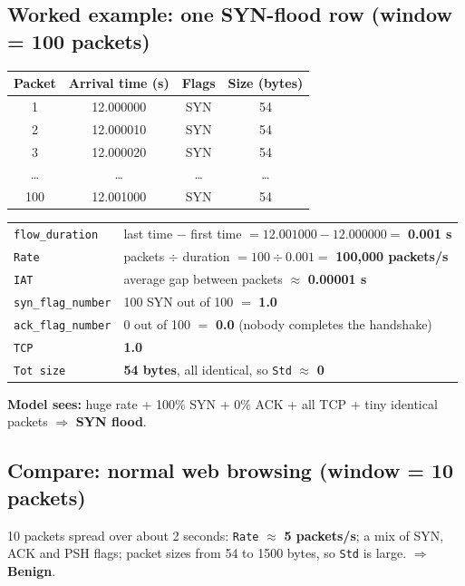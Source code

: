 \documentclass[11pt]{article}
\begin{document}
\subsection*{Worked example: one SYN-flood row (window = 100 packets)}
\begin{center}
\begin{tabular}{@{}c c c c@{}}
\toprule
Packet & Arrival time (s) & Flags & Size (bytes) \\
\midrule
1 & 12.000000 & SYN & 54 \\
2 & 12.000010 & SYN & 54 \\
3 & 12.000020 & SYN & 54 \\
\dots & \dots & \dots & \dots \\
100 & 12.001000 & SYN & 54 \\
\bottomrule
\end{tabular}
\end{center}

\begin{tabular}{@{}l l@{}}
\texttt{flow\_duration} & last time $-$ first time $= 12.001000 - 12.000000 = $ \textbf{0.001 s} \\
\texttt{Rate} & packets $\div$ duration $= 100 \div 0.001 = $ \textbf{100{,}000 packets/s} \\
\texttt{IAT} & average gap between packets $\approx$ \textbf{0.00001 s} \\
\texttt{syn\_flag\_number} & 100 SYN out of 100 $=$ \textbf{1.0} \\
\texttt{ack\_flag\_number} & 0 out of 100 $=$ \textbf{0.0} (nobody completes the handshake) \\
\texttt{TCP} & \textbf{1.0} \\
\texttt{Tot size} & \textbf{54 bytes}, all identical, so \texttt{Std} $\approx$ \textbf{0} \\
\end{tabular}

\vspace{6pt}
\textbf{Model sees:} huge rate + 100\% SYN + 0\% ACK + all TCP + tiny identical packets $\Rightarrow$ \textbf{SYN flood}.

\subsection*{Compare: normal web browsing (window = 10 packets)}
10 packets spread over about 2 seconds: \texttt{Rate} $\approx$ \textbf{5 packets/s}; a mix of SYN, ACK and PSH flags;
packet sizes from 54 to 1500 bytes, so \texttt{Std} is large. $\Rightarrow$ \textbf{Benign}.
\end{document}
